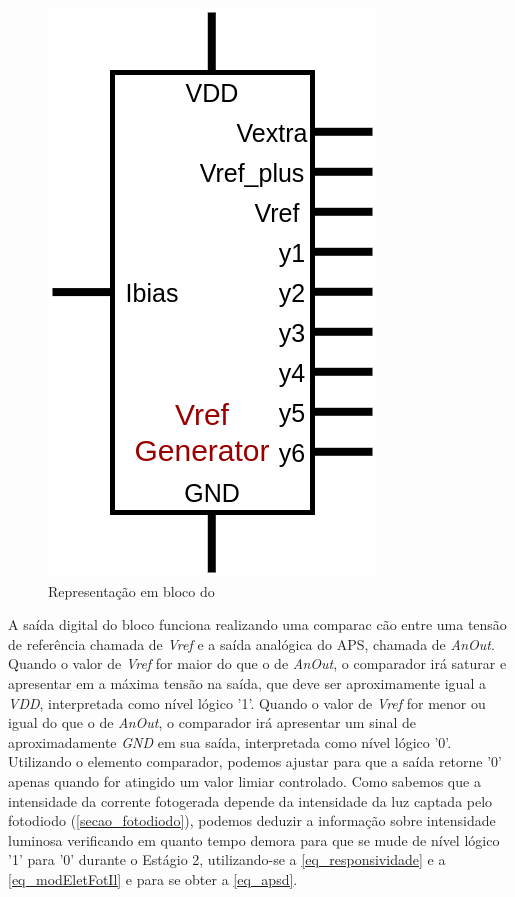 \begin{figure}[htb]
 \centering
    \centering
    \caption{Representa{\c c}\~ao em bloco do \NomeBloco} \label{\NomeSFig}
    \includegraphics[scale=0.3]{Circuitos/vref_generator_block.png}
\end{figure}

A sa\'ida digital do bloco funciona realizando uma compara{c c}\~ao entre uma tens\~ao de refer\^encia chamada de \emph{Vref} e a sa\'ida anal\'ogica do APS, chamada de \emph{AnOut}. Quando o valor de \emph{Vref} for maior do que o de \emph{AnOut}, o comparador ir\'a saturar e apresentar em a m\'axima tens\~ao na sa\'ida, que deve ser aproximamente igual a \emph{VDD}, interpretada como n\'ivel l\'ogico '1'. Quando o valor de \emph{Vref} for menor ou igual do que o de \emph{AnOut}, o comparador ir\'a apresentar um sinal de aproximadamente \emph{GND} em sua sa\'ida, interpretada como n\'ivel l\'ogico '0'.
Utilizando o elemento comparador, podemos ajustar para que a sa\'ida retorne '0' apenas quando for atingido um valor limiar controlado. Como sabemos que a intensidade da corrente fotogerada depende da intensidade da luz captada pelo fotodiodo (\autoref{secao_fotodiodo}), podemos deduzir a informa{\c c}\~ao sobre intensidade luminosa verificando em quanto tempo demora para que se mude de n\'ivel l\'ogico '1' para '0' durante o Est\'agio 2, utilizando-se a \autoref{eq_responsividade} e a \autoref{eq_modEletFotIl} e para se obter a \autoref{eq_apsd}.


